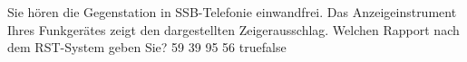     {Sie hören die Gegenstation in SSB-Telefonie einwandfrei. Das Anzeigeinstrument Ihres Funkgerätes zeigt den dargestellten Zeigerausschlag. Welchen Rapport nach dem RST-System geben Sie?}
    {59}
    {39}
    {95}
    {56}
    {true}{false}